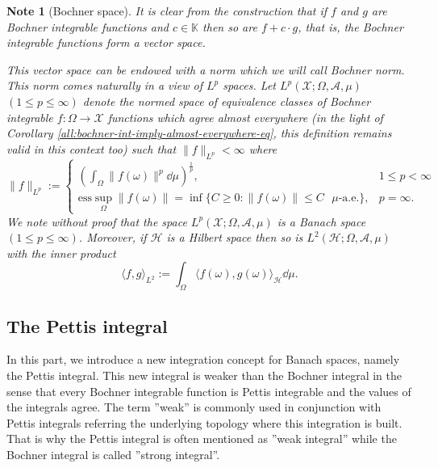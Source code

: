 \documentclass[a4paper, 12pt]{article}
\newtheorem{note}[lem]{Note}
\begin{document}
\begin{note}[Bochner space]\label{no:bochner-space}\normalfont It is clear from the construction that if $f$ and $g$ are Bochner integrable functions and $c \in \mathbb{K}$ then so are $f + c \cdot g$, that is, the Bochner integrable functions form a vector space.

This vector space can be endowed with a norm which we will call Bochner norm. This norm comes naturally in a view of $L^p$ spaces. Let $L^p(\mathcal{X}; \Omega, \mathcal{A}, \mu)$ $(1 \leqslant p \leqslant \infty)$ denote the normed space of equivalence classes of Bochner integrable $f\colon \Omega \to \mathcal{X}$ functions which agree almost everywhere (in the light of Corollary \ref{all:bochner-int-imply-almost-everywhere-eq}, this definition remains valid in this context too) such that $ \| f \|_{L^p} < \infty$ where
\begin{displaymath}
 \| f \|_{L^p} := \left\{
    \begin{array}{ll}
      \left(\int_{\Omega} \| f(\omega) \|^p  \dd{\mu} \right)^{\frac{1}{p}}, &  1 \leqslant p < \infty \\
      \mathrm{ess}\sup_{\Omega} \|f(\omega)\| = \inf \lbrace C \geqslant 0 : \|f(\omega)\| \leqslant C \text{ $\mu$-a.e.} \rbrace, &  p = \infty.
    \end{array}
  \right.
\end{displaymath}
We note without proof that the space $L^p(\mathcal{X}; \Omega, \mathcal{A}, \mu)$ is a Banach space $(1 \leqslant p \leqslant \infty)$. Moreover, if $\mathcal{H}$ is a Hilbert space then so is $L^2(\mathcal{H}; \Omega, \mathcal{A}, \mu)$ with the inner product 
$$
\langle f, g \rangle_{L^2} := \int_{\Omega} \langle f(\omega), g(\omega) \rangle_{\mathcal{H}} \dd{\mu}.
$$
\end{note}
\subsection{The Pettis integral}\label{subsec:pettis-integral} In this part, we introduce a new integration concept for Banach spaces, namely the Pettis integral. This new integral is weaker than the Bochner integral in the sense that every Bochner integrable function is Pettis integrable and the values of the integrals agree.  The term ''weak'' is commonly used in conjunction with Pettis integrals referring the underlying topology where this integration is built. That is why the Pettis integral is often mentioned as ''weak integral'' while the Bochner integral is called ''strong integral''.
\end{document}
